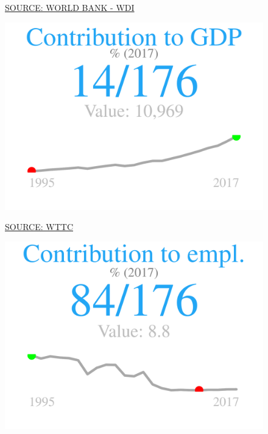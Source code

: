 \documentclass{article}\usepackage[]{graphicx}\usepackage[]{color}
\makeatletter
\def\maxwidth{ %
  \ifdim\Gin@nat@width>\linewidth
    \linewidth
  \else
    \Gin@nat@width
  \fi
}
\makeatother
\begin{document}
\begin{figure}
\begin{minipage}[t]{0.99\textwidth}
\begin{minipage}[t]{0.56\textwidth}
\begin{minipage}[c]{0.30\textwidth}
    \vspace{-2ex}
    \hspace{2ex}\tiny{\href{http://data.worldbank.org/data-catalog/world-development-indicators}{\textcolor[HTML]{722FF5}{SOURCE: WORLD BANK - WDI}}}
    \vspace{3ex}
    \end{minipage}
    \begin{minipage}[c]{0.30\textwidth}


{\centering \includegraphics[width=\maxwidth]{figure/figure_sparkline3-1} 

}



    \vspace{-2ex}
    \hspace{2ex}\tiny{\href{https://tool.wttc.org/}{\textcolor[HTML]{722FF5}{SOURCE: WTTC}}}
    \vspace{3ex}
    \end{minipage}
    
    \begin{minipage}[c]{0.30\textwidth}


{\centering \includegraphics[width=\maxwidth]{figure/figure_sparkline4-1} 

}
\end{minipage}
\end{minipage}
\end{minipage}
\end{figure}
\end{document}
